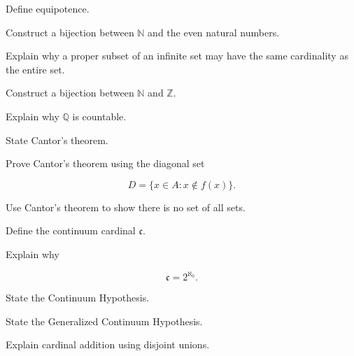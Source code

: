 \begin{exercise}[2]
Define equipotence.
\end{exercise}

\begin{exercise}[2]
Construct a bijection between \(\mathbb{N}\) and the even natural numbers.
\end{exercise}

\begin{exercise}[3]
Explain why a proper subset of an infinite set may have the same
cardinality as the entire set.
\end{exercise}

\begin{exercise}[3]
Construct a bijection between \(\mathbb{N}\) and \(\mathbb{Z}\).
\end{exercise}

\begin{exercise}[3]
Explain why \(\mathbb{Q}\) is countable.
\end{exercise}

\begin{exercise}[3]
State Cantor's theorem.
\end{exercise}

\begin{exercise}[3]
Prove Cantor's theorem using the diagonal set

\[
D
=
\{x\in A:x\notin f(x)\}.
\]
\end{exercise}

\begin{exercise}[3]
Use Cantor's theorem to show there is no set of all sets.
\end{exercise}

\begin{exercise}[2]
Define the continuum cardinal \(\mathfrak{c}\).
\end{exercise}

\begin{exercise}[3]
Explain why

\[
\mathfrak{c}
=
2^{\aleph_0}.
\]
\end{exercise}

\begin{exercise}[2]
State the Continuum Hypothesis.
\end{exercise}

\begin{exercise}[3]
State the Generalized Continuum Hypothesis.
\end{exercise}

\begin{exercise}[3]
Explain cardinal addition using disjoint unions.
\end{exercise}


